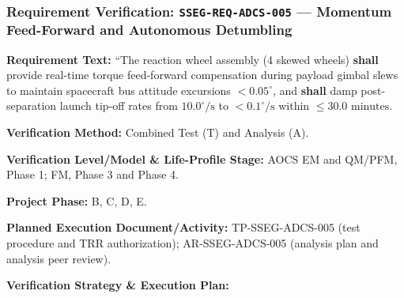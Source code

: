 \subsubsection{Requirement Verification: \texttt{SSEG-REQ-ADCS-005} --- Momentum Feed-Forward and Autonomous Detumbling}
\label{ver:SSEG-REQ-ADCS-005}
\textbf{Requirement Text:} ``The  reaction wheel assembly (4 skewed wheels) \textbf{shall} provide real-time torque feed-forward compensation during payload gimbal slews to maintain spacecraft bus attitude excursions $< 0.05^\circ$, and \textbf{shall} damp post-separation launch tip-off rates from $10.0^\circ/\text{s}$ to $< 0.1^\circ/\text{s}$ within $\le 30.0\text{ minutes}$.
\par\textbf{Verification Method:} Combined Test (T) and Analysis (A).
\par\textbf{Verification Level/Model \& Life-Profile Stage:} AOCS EM and QM/PFM, Phase 1; FM, Phase 3 and Phase 4.
\par\textbf{Project Phase:} B, C, D, E.
\par\textbf{Planned Execution Document/Activity:} TP-SSEG-ADCS-005 (test procedure and TRR authorization); AR-SSEG-ADCS-005 (analysis plan and analysis peer review).
\par\textbf{Verification Strategy \& Execution Plan:}
